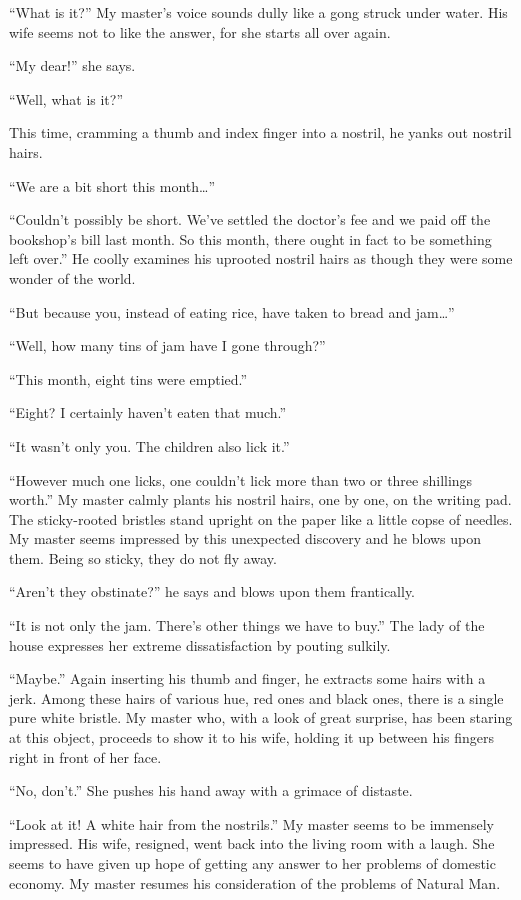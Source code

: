 \documentclass{book}
\begin{document}
``What is it?'' My master's voice sounds dully like a gong struck under
water. His wife seems not to like the answer, for she starts all over
again.

``My dear!'' she says.

``Well, what is it?''

This time, cramming a thumb and index finger into a nostril, he yanks
out nostril hairs.

``We are a bit short this month\ldots{}''

``Couldn't possibly be short. We've settled the doctor's fee and we paid
off the bookshop's bill last month. So this month, there ought in fact
to be something left over.'' He coolly examines his uprooted nostril
hairs as though they were some wonder of the world.

``But because you, instead of eating rice, have taken to bread and
jam\ldots{}''

``Well, how many tins of jam have I gone through?''

``This month, eight tins were emptied.''

``Eight? I certainly haven't eaten that much.''

``It wasn't only you. The children also lick it.''

``However much one licks, one couldn't lick more than two or three
shillings worth.'' My master calmly plants his nostril hairs, one by
one, on the writing pad. The sticky-rooted bristles stand upright on the
paper like a little copse of needles. My master seems impressed by this
unexpected discovery and he blows upon them. Being so sticky, they do
not fly away.

``Aren't they obstinate?'' he says and blows upon them frantically.

``It is not only the jam. There's other things we have to buy.'' The
lady of the house expresses her extreme dissatisfaction by pouting
sulkily.

``Maybe.'' Again inserting his thumb and finger, he extracts some hairs
with a jerk. Among these hairs of various hue, red ones and black ones,
there is a single pure white bristle. My master who, with a look of
great surprise, has been staring at this object, proceeds to show it to
his wife, holding it up between his fingers right in front of her face.

``No, don't.'' She pushes his hand away with a grimace of distaste.

``Look at it! A white hair from the nostrils.'' My master seems to be
immensely impressed. His wife, resigned, went back into the living room
with a laugh. She seems to have given up hope of getting any answer to
her problems of domestic economy. My master resumes his consideration of
the problems of Natural Man.
\end{document}
